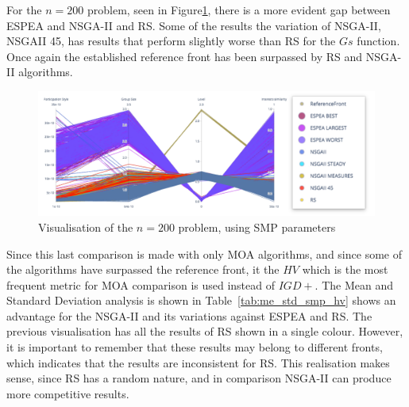 For the $n=200$ problem, seen in Figure\ref{fig:3d_smp_200}, there is a more evident gap between ESPEA and NSGA-II and RS. Some of the results the variation of NSGA-II, NSGAII 45, has results that perform slightly worse than RS for the $Gs$ function. Once again the established reference front has been surpassed by RS and NSGA-II algorithms.

\begin{figure}[H]
    \centering
    \includegraphics[width=\textwidth]{images/smp_200.png}
    \caption{Visualisation of the $n=200$ problem, using SMP parameters}
    \label{fig:3d_smp_200}
\end{figure}

Since this last comparison is made with only MOA algorithms, and since some of the algorithms have surpassed the reference front, it the $HV$ which is the most frequent metric for MOA comparison is used instead of $IGD+$. The Mean and Standard Deviation analysis is shown in Table~\ref{tab:me_std_smp_hv} shows an advantage for the NSGA-II and its variations against ESPEA and RS. The previous visualisation has all the results of RS shown in a single colour. However, it is important to remember that these results may belong to different fronts, which indicates that the results are inconsistent for RS. This realisation makes sense, since RS has a random nature, and in comparison NSGA-II can produce more competitive results.


